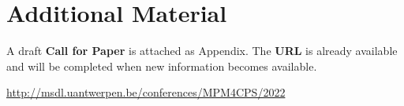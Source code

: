 \section{Additional Material}
\label{sec:Appendix}

A draft \textbf{Call for Paper} is attached as Appendix.
The \textbf{URL} is already available and will be completed when new information
becomes available.

\noindent
\url{http://msdl.uantwerpen.be/conferences/MPM4CPS/2022}

\newpage
%

